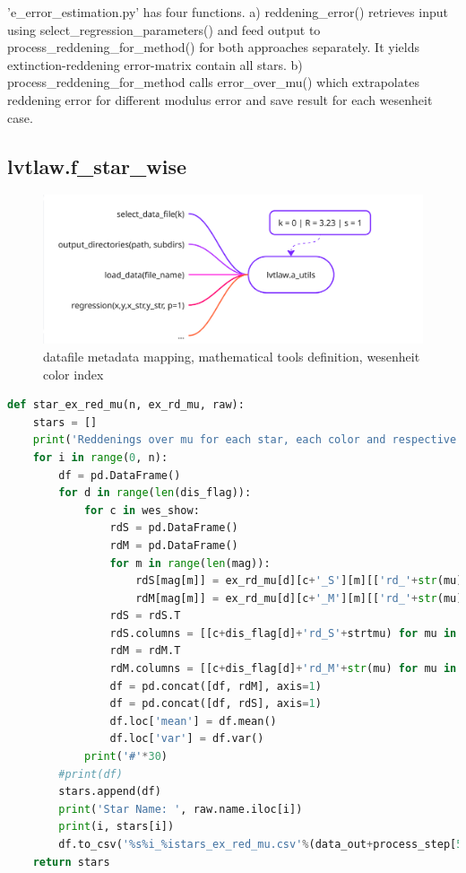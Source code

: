 \documentclass{article}
\begin{document}
'e\_error\_estimation.py' has four functions. a) reddening\_error() retrieves input using select\_regression\_parameters() and feed output to process\_reddening\_for\_method() for both approaches separately. It yields extinction-reddening error-matrix contain all stars. b) process\_reddening\_for\_method calls error\_over\_mu() which extrapolates reddening error for different modulus error and save result for each wesenheit case.  


\newpage
\subsection{lvtlaw.f\_star\_wise}

\begin{figure}[h!]
\caption{\small datafile metadata mapping, mathematical tools definition, wesenheit color index}
\includegraphics[width=\textwidth]{./figures/f_star_wise.png}
\end{figure}

\begin{lstlisting}[language=Python, caption=dependencies for main.py]
def star_ex_red_mu(n, ex_rd_mu, raw):
    stars = []
    print('Reddenings over mu for each star, each color and respective distance')
    for i in range(0, n):
        df = pd.DataFrame()
        for d in range(len(dis_flag)):
            for c in wes_show:
                rdS = pd.DataFrame()
                rdM = pd.DataFrame()
                for m in range(len(mag)):
                    rdS[mag[m]] = ex_rd_mu[d][c+'_S'][m][['rd_'+str(mu) for mu in del_mu]].iloc[i].values
                    rdM[mag[m]] = ex_rd_mu[d][c+'_M'][m][['rd_'+str(mu) for mu in del_mu]].iloc[i].values
                rdS = rdS.T
                rdS.columns = [[c+dis_flag[d]+'rd_S'+strtmu) for mu in del_mu]]  # Make sure number matches df.shape[1]
                rdM = rdM.T
                rdM.columns = [[c+dis_flag[d]+'rd_M'+str(mu) for mu in del_mu]]  # Make sure number matches df.shape[1]
                df = pd.concat([df, rdM], axis=1)                         
                df = pd.concat([df, rdS], axis=1)   
                df.loc['mean'] = df.mean()
                df.loc['var'] = df.var()                       
            print('#'*30)
        #print(df)
        stars.append(df)
        print('Star Name: ', raw.name.iloc[i])
        print(i, stars[i])                         
        df.to_csv('%s%i_%istars_ex_red_mu.csv'%(data_out+process_step[5],i, n))
    return stars
            
\end{lstlisting}
\end{document}
